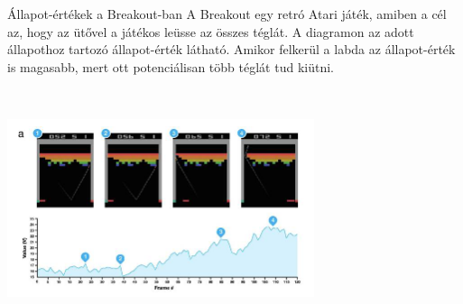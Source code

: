 \documentclass[english, aspectratio=169]{beamer}
\begin{document}
\begin{frame}{Állapot-értékek a Breakout-ban}
A Breakout egy retró Atari játék, amiben a cél az, hogy az ütővel a játékos leüsse az összes téglát. A diagramon az adott állapothoz tartozó állapot-érték látható. Amikor felkerül a labda az állapot-érték is magasabb, mert ott potenciálisan több téglát tud kiütni. 
\begin{center}
\includegraphics[width=9cm, height=7cm, keepaspectratio]{images/breakout.png}
\end{center}
\end{frame}
\end{document}
